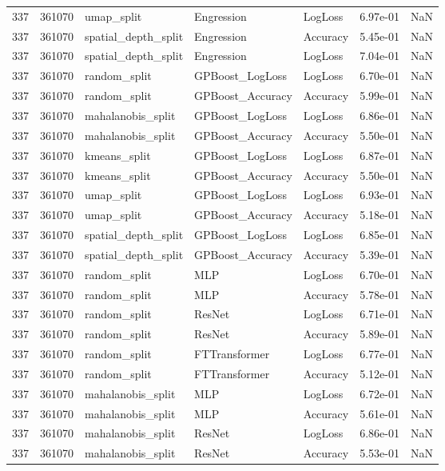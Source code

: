 \begin{tabular}{rrlllrr}
337 & 361070 & umap\_split & Engression & LogLoss & 6.97e-01 & NaN \\
337 & 361070 & spatial\_depth\_split & Engression & Accuracy & 5.45e-01 & NaN \\
337 & 361070 & spatial\_depth\_split & Engression & LogLoss & 7.04e-01 & NaN \\
337 & 361070 & random\_split & GPBoost\_LogLoss & LogLoss & 6.70e-01 & NaN \\
337 & 361070 & random\_split & GPBoost\_Accuracy & Accuracy & 5.99e-01 & NaN \\
337 & 361070 & mahalanobis\_split & GPBoost\_LogLoss & LogLoss & 6.86e-01 & NaN \\
337 & 361070 & mahalanobis\_split & GPBoost\_Accuracy & Accuracy & 5.50e-01 & NaN \\
337 & 361070 & kmeans\_split & GPBoost\_LogLoss & LogLoss & 6.87e-01 & NaN \\
337 & 361070 & kmeans\_split & GPBoost\_Accuracy & Accuracy & 5.50e-01 & NaN \\
337 & 361070 & umap\_split & GPBoost\_LogLoss & LogLoss & 6.93e-01 & NaN \\
337 & 361070 & umap\_split & GPBoost\_Accuracy & Accuracy & 5.18e-01 & NaN \\
337 & 361070 & spatial\_depth\_split & GPBoost\_LogLoss & LogLoss & 6.85e-01 & NaN \\
337 & 361070 & spatial\_depth\_split & GPBoost\_Accuracy & Accuracy & 5.39e-01 & NaN \\
337 & 361070 & random\_split & MLP & LogLoss & 6.70e-01 & NaN \\
337 & 361070 & random\_split & MLP & Accuracy & 5.78e-01 & NaN \\
337 & 361070 & random\_split & ResNet & LogLoss & 6.71e-01 & NaN \\
337 & 361070 & random\_split & ResNet & Accuracy & 5.89e-01 & NaN \\
337 & 361070 & random\_split & FTTransformer & LogLoss & 6.77e-01 & NaN \\
337 & 361070 & random\_split & FTTransformer & Accuracy & 5.12e-01 & NaN \\
337 & 361070 & mahalanobis\_split & MLP & LogLoss & 6.72e-01 & NaN \\
337 & 361070 & mahalanobis\_split & MLP & Accuracy & 5.61e-01 & NaN \\
337 & 361070 & mahalanobis\_split & ResNet & LogLoss & 6.86e-01 & NaN \\
337 & 361070 & mahalanobis\_split & ResNet & Accuracy & 5.53e-01 & NaN \\

\end{tabular}
